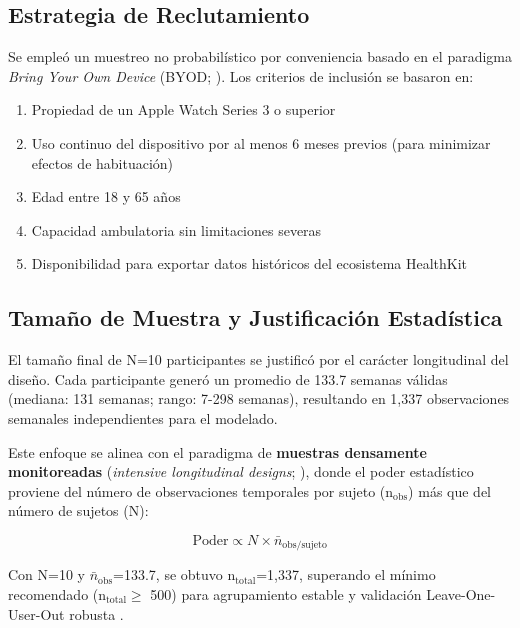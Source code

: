 \subsection{Estrategia de Reclutamiento}
\label{subsec:reclutamiento}

Se empleó un muestreo no probabilístico por conveniencia basado en el paradigma \textit{Bring Your Own Device} (BYOD; \cite{Doherty2021}). Los criterios de inclusión se basaron en:

\begin{enumerate}
    \item Propiedad de un Apple Watch Series 3 o superior
    \item Uso continuo del dispositivo por al menos 6 meses previos (para minimizar efectos de habituación)
    \item Edad entre 18 y 65 años
    \item Capacidad ambulatoria sin limitaciones severas
    \item Disponibilidad para exportar datos históricos del ecosistema HealthKit
\end{enumerate}

\subsection{Tamaño de Muestra y Justificación Estadística}
\label{subsec:justificacion_n}

El tamaño final de N=10 participantes se justificó por el carácter longitudinal del diseño. Cada participante generó un promedio de 133.7 semanas válidas (mediana: 131 semanas; rango: 7-298 semanas), resultando en 1,337 observaciones semanales independientes para el modelado.

Este enfoque se alinea con el paradigma de \textbf{muestras densamente monitoreadas} (\textit{intensive longitudinal designs}; \cite{Bolger2013}), donde el poder estadístico proviene del número de observaciones temporales por sujeto (n$_{\text{obs}}$) más que del número de sujetos (N):

\begin{equation}
\text{Poder} \propto N \times \bar{n}_{\text{obs/sujeto}}
\label{eq:poder_longitudinal}
\end{equation}

Con N=10 y $\bar{n}_{\text{obs}}$=133.7, se obtuvo n$_{\text{total}}$=1,337, superando el mínimo recomendado (n$_{\text{total}} \geq$ 500) para agrupamiento estable y validación Leave-One-User-Out robusta \cite{Alinia2020}.

